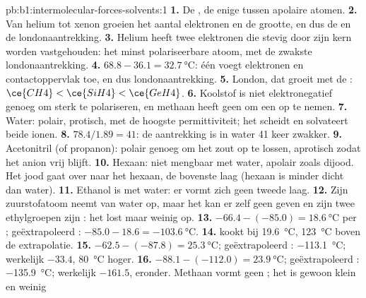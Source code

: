 \begin{solution}{pb:b1:intermolecular-forces-solvents:1}
\textbf{1.} De , de enige tussen apolaire atomen.
\textbf{2.} Van helium tot xenon groeien het aantal elektronen en de
grootte, en dus de  en de londonaantrekking.
\textbf{3.} Helium heeft twee elektronen die stevig door zijn kern
worden vastgehouden: het minst polariseerbare atoom, met de zwakste
londonaantrekking.
\textbf{4.} $68.8 - 36.1 = \qty{32.7}{\celsius}$: één  voegt
elektronen en contactoppervlak toe, en dus londonaantrekking.
\textbf{5.} London, dat groeit met de :
$\ce{CH4} < \ce{SiH4} <
\ce{GeH4}$.
\textbf{6.} Koolstof is niet elektronegatief genoeg om  sterk te
polariseren, en methaan heeft geen  om een  op te
nemen.
\textbf{7.} Water: polair, protisch, met de hoogste permittiviteit; het
scheidt en solvateert beide ionen.
\textbf{8.} $78.4/1.89 = 41$: de aantrekking is in water 41 keer zwakker.
\textbf{9.} Acetonitril (of propanon): polair genoeg om het zout op te
lossen, aprotisch zodat het anion vrij blijft.
\textbf{10.} Hexaan: niet mengbaar met water, apolair zoals dijood. Het
jood gaat over naar het hexaan, de bovenste laag (hexaan is minder dicht
dan water).
\textbf{11.} Ethanol is  met water: er vormt zich geen tweede
laag.
\textbf{12.} Zijn zuurstofatoom neemt  van water op, maar
het kan er zelf geen geven en zijn twee ethylgroepen zijn : het
lost maar weinig op.
\textbf{13.} $-66.4 - (-85.0) = \qty{18.6}{\celsius}$ per ;
geëxtrapoleerd : $-85.0 - 18.6 = \qty{-103.6}{\celsius}$.
\textbf{14.}  kookt bij \qty{19.6}{\celsius}, \qty{123}{\celsius}
boven de extrapolatie.
\textbf{15.} $-62.5 - (-87.8) = \qty{25.3}{\celsius}$; geëxtrapoleerd
: \qty{-113.1}{\celsius}; werkelijk $-33.4$, \qty{80}{\celsius}
hoger.
\textbf{16.} $-88.1 - (-112.0) = \qty{23.9}{\celsius}$; geëxtrapoleerd
: \qty{-135.9}{\celsius}; werkelijk $-161.5$, eronder. Methaan
vormt geen ; het is gewoon klein en weinig

\end{solution}
